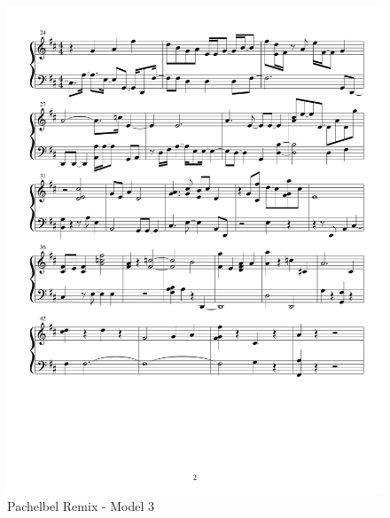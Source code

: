 \documentclass{article} %
\begin{document}
\begin{figure}[H]
\centering
\caption{Pachelbel Remix - Model 3}
\includegraphics [scale = 0.6] {PachelbelRemix2H-cropped.pdf}
\end{figure}
\end{document}
